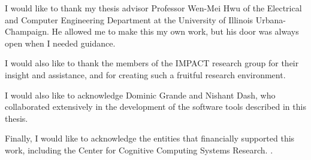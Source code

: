 I would like to thank my thesis advisor Professor Wen-Mei Hwu of the Electrical and Computer Engineering Department at the University of Illinois Urbana-Champaign.
He allowed me to make this my own work, but his door was always open when I needed guidance.

I would also like to thank the members of the IMPACT research group for their insight and assistance, and for creating such a fruitful research environment.

I would also like to acknowledge Dominic Grande and Nishant Dash, who collaborated extensively in the development of the software tools described in this thesis.

Finally, I would like to acknowledge the entities that financially supported this work, including the Center for Cognitive Computing Systems Research.
.